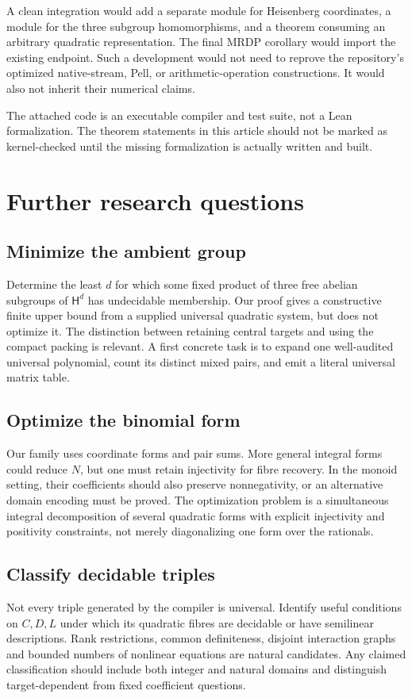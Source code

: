 \documentclass[11pt,letterpaper]{article}
\theoremstyle{definition}
\theoremstyle{remark}
\newcommand{\HH}{\mathsf H}
\begin{document}
A clean integration would add a separate module for Heisenberg coordinates,
a module for the three subgroup homomorphisms, and a theorem consuming an
arbitrary quadratic representation. The final MRDP corollary would import
the existing endpoint. Such a development would not need to reprove the
repository's optimized native-stream, Pell, or arithmetic-operation
constructions. It would also not inherit their numerical claims.

The attached code is an executable compiler and test suite, not a Lean
formalization. The theorem statements in this article should not be marked
as kernel-checked until the missing formalization is actually written and
built.

\section{Further research questions}
\label{gts:tp:sec:future}

\subsection{Minimize the ambient group}\label{gts:tp:q:ambient}
Determine the least $d$ for which some fixed product of three free abelian
subgroups of $\HH^d$ has undecidable membership. Our proof gives a
constructive finite upper bound from a supplied universal quadratic system,
but does not optimize it. The distinction between retaining central
targets and using the compact packing is relevant. A first concrete task is
to expand one well-audited universal polynomial, count its distinct mixed
pairs, and emit a literal universal matrix table.

\subsection{Optimize the binomial form}\label{gts:tp:q:binomial}
Our family uses coordinate forms and pair sums. More general integral forms
could reduce $N$, but one must retain injectivity for fibre recovery. In the
monoid setting, their coefficients should also preserve nonnegativity, or
an alternative domain encoding must be proved. The optimization problem is
a simultaneous integral decomposition of several quadratic forms with
explicit injectivity and positivity constraints, not merely diagonalizing
one form over the rationals.

\subsection{Classify decidable triples}\label{gts:tp:q:classify}
Not every triple generated by the compiler is universal. Identify useful
conditions on $C,D,L$ under which its quadratic fibres are decidable or have
semilinear descriptions. Rank restrictions, common definiteness,
disjoint interaction graphs and bounded numbers of nonlinear equations are
natural candidates. Any claimed classification should include both
integer and natural domains and distinguish target-dependent from fixed
coefficient questions.
\end{document}
